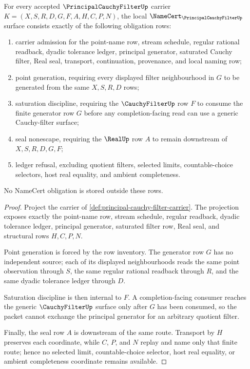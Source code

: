 \begin{theorem}
\label{thm:principal-cauchy-filter-namecert-obligations}
For every accepted $\PrincipalCauchyFilterUp$ carrier $K=(X,S,R,D,G,F,A,H,C,P,N)$, the local $\NameCert_{\PrincipalCauchyFilterUp}$ surface consists exactly of the following obligation rows:
\begin{enumerate}
\item carrier admission for the point-name row, stream schedule, regular rational readback, dyadic tolerance ledger, principal generator, saturated Cauchy filter, Real seal, transport, continuation, provenance, and local naming row;
\item point generation, requiring every displayed filter neighbourhood in $G$ to be generated from the same $X,S,R,D$ rows;
\item saturation discipline, requiring the $\CauchyFilterUp$ row $F$ to consume the finite generator row $G$ before any completion-facing read can use a generic Cauchy-filter surface;
\item seal nonescape, requiring the $\RealUp$ row $A$ to remain downstream of $X,S,R,D,G,F$;
\item ledger refusal, excluding quotient filters, selected limits, countable-choice selectors, host real equality, and ambient completeness.
\end{enumerate}
No NameCert obligation is stored outside these rows.
\end{theorem}
\begin{proof}
Project the carrier of \autoref{def:principal-cauchy-filter-carrier}. The projection exposes exactly the point-name row, stream schedule, regular readback, dyadic tolerance ledger, principal generator, saturated filter row, Real seal, and structural rows $H,C,P,N$.

Point generation is forced by the row inventory. The generator row $G$ has no independent source; each of its displayed neighbourhoods reads the same point observation through $S$, the same regular rational readback through $R$, and the same dyadic tolerance ledger through $D$.

Saturation discipline is then internal to $F$. A completion-facing consumer reaches the generic $\CauchyFilterUp$ surface only after $G$ has been consumed, so the packet cannot exchange the principal generator for an arbitrary quotient filter.

Finally, the seal row $A$ is downstream of the same route. Transport by $H$ preserves each coordinate, while $C$, $P$, and $N$ replay and name only that finite route; hence no selected limit, countable-choice selector, host real equality, or ambient completeness coordinate remains available.
\end{proof}

